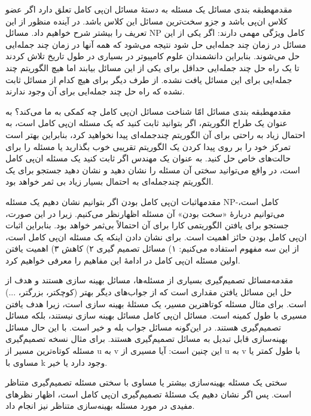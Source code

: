 \begin{itemframe-s}{مقدمه}{طبقه بندی مسائل}
\itm
یک مسئله به دستهٔ مسائل ان‌پی کامل
تعلق دارد اگر عضو کلاس ان‌پی باشد و جزو سخت‌ترین مسائل این کلاس باشد. در آینده منظور از این تعریف را بیشتر شرح خواهیم داد.
\itm
مسائل NP کامل ویژگی مهمی دارند: اگر یکی از این مسائل در زمان چند جمله‌ایی حل شود نتیجه می‌شود که همه آنها در زمان چند جمله‌ایی حل می‌شوند.
 \itm
بنابراین دانشمندان علوم کامپیوتر در بسیاری در طول تاریخ تلاش کردند تا یک راه حل چند جمله‌ایی حداقل برای یکی از این مسائل بیابند اما هیچ الگوریتم چند جمله‌ایی برای این مسائل یافت نشده.
 \itm
از طرف دیگر برای هیچ کدام از مسائل ثابت نشده که راه حل چند جمله‌ایی برای آن وجود ندارند.
\end{itemframe-s}

\begin{itemframe-s}{مقدمه}{طبقه بندی مسائل}
\itm
امّا شناخت مسائل ان‌پی کامل چه کمکی به ما می‌کند؟
\itm
به عنوان یک طراح الگوریتم، اگر بتوانید ثابت کنید که یک مسئله ان‌پی کامل است، به احتمال زیاد به راحتی برای آن الگوریتم چندجمله‌ای پیدا نخواهید کرد، بنابراین بهتر است تمرکز خود را بر روی پیدا کردن یک الگوریتم تقریبی خوب بگذارید یا مسئله را برای حالت‌های خاص حل کنید.
\itm
به عنوان یک مهندس اگر ثابت کنید یک مسئله ان‌پی کامل است، در واقع می‌توانید سختی آن مسئله را نشان دهید و نشان دهید جستجو برای یک الگوریتم چندجمله‌ای به احتمال بسیار زیاد بی ثمر خواهد بود.
\end{itemframe-s}

\begin{itemframe-s}{مقدمه}{اثبات ان‌پی کامل بودن}
\itm
اگر بتوانیم نشان دهیم یک مسئله NP-کامل است، می‌توانیم دربارهٔ «سخت بودن» آن مسئله اظهارنظر می‌کنیم. زیرا در این صورت، جستجو برای یافتن الگوریتمی کارا برای آن احتمالاً بی‌ثمر خواهد بود.
\itm
بنابراین اثبات ان‌پی کامل بودن حائز اهمیت است. برای نشان دادن اینکه یک مسئله ان‌پی کامل است، از این سه مفهوم استفاده می‌کنیم: ۱) مسائل تصمیم گیری ۲) کاهش ۳) اهمیت یافتن اولین مسئله ان‌پی کامل
\itm
در ادامهٔ این مفاهیم را معرفی خواهیم کرد.
\end{itemframe-s}

\begin{itemframe-s}{مقدمه‌}{مسائل تصمیم‌گیری}
\itm
بسیاری از مسئله‌ها، مسائل بهینه سازی
هستند و هدف از حل این مسائل یافتن مقداری است که از جواب‌های دیگر بهتر (کوچکتر، بزرگتر، ...) است. برای مثال مسئله کوتاهترین مسیر، یک مسئلهٔ بهینه سازی است، زیرا هدف یافتن مسیری با طول کمینه است.
\itm
مسائل ان‌پی کامل مسائل بهینه سازی نیستند، بلکه مسائل تصمیم‌گیری
هستند. در این‌گونه مسائل جواب بله و خیر است.
\itm
با این حال مسائل بهینه‌سازی قابل تبدیل به مسائل تصمیم‌گیری هستند. برای مثال نسخه تصمیم‌گیری مسئله کوتاه‌ترین مسیر از u به v این چنین است: آیا مسیری از u به v با طول کمتر یا مساوی با k وجود دارد یا خیر.

\itm
سختی یک مسئله بهینه‌سازی بیشتر یا مساوی با سختی مسئله تصمیم‌گیری متناظر است. پس اگر نشان دهیم یک مسئلهٔ تصمیم‌گیری ان‌پی کامل است، اظهار نظرهای مفیدی در مورد مسئله بهینه‌سازی متناظر نیز انجام داد.
\end{itemframe-s}

